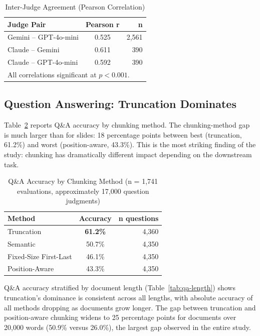 \documentclass{ieeeaccess}
\begin{document}
\begin{table}[h]
\caption{Inter-Judge Agreement (Pearson Correlation)}
\label{tab:agreement}
\centering
\footnotesize
\begin{tabular}{|l|c|r|}
\hline
\textbf{Judge Pair} & \textbf{Pearson r} & \textbf{n} \\
\hline
Gemini -- GPT-4o-mini & 0.525 & 2,561 \\
Claude -- Gemini & 0.611 & 390 \\
Claude -- GPT-4o-mini & 0.592 & 390 \\
\hline
\multicolumn{3}{l}{\scriptsize All correlations significant at $p < 0.001$.}
\end{tabular}
\end{table}

\subsection{Question Answering: Truncation Dominates}
\label{sec:qa-results}

Table~\ref{tab:qa} reports Q\&A accuracy by chunking method. The chunking-method gap is much larger than for slides: 18 percentage points between best (truncation, 61.2\%) and worst (position-aware, 43.3\%). This is the most striking finding of the study: chunking has dramatically different impact depending on the downstream task.

\begin{table}[h]
\caption{Q\&A Accuracy by Chunking Method (n = 1,741 evaluations, approximately 17,000 question judgments)}
\label{tab:qa}
\centering
\begin{tabular}{|l|c|r|}
\hline
\textbf{Method} & \textbf{Accuracy} & \textbf{n questions} \\
\hline
Truncation & \textbf{61.2\%} & 4,360 \\
Semantic & 50.7\% & 4,350 \\
Fixed-Size First-Last & 46.1\% & 4,350 \\
Position-Aware & 43.3\% & 4,350 \\
\hline
\end{tabular}
\end{table}

Q\&A accuracy stratified by document length (Table~\ref{tab:qa-length}) shows truncation's dominance is consistent across all lengths, with absolute accuracy of all methods dropping as documents grow longer. The gap between truncation and position-aware chunking widens to 25 percentage points for documents over 20,000 words (50.9\% versus 26.0\%), the largest gap observed in the entire study.
\end{document}
